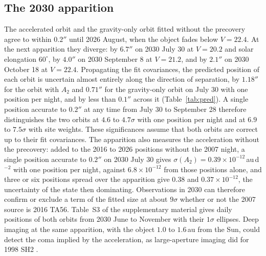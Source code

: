 \documentclass[3p,11pt]{elsarticle}
\begin{document}
\subsection{The 2030 apparition}

The accelerated orbit and the gravity-only orbit fitted without the precovery agree to
within $0.2''$ until 2026 August, when the object fades below $V=22.4$. At the next
apparition they diverge: by $6.7''$ on 2030 July 30 at $V=20.2$ and solar elongation
$60^\circ$, by $4.0''$ on 2030 September 8 at $V=21.2$, and by $2.1''$ on 2030 October 18
at $V=22.4$. Propagating the fit covariances, the predicted position of each orbit is
uncertain almost entirely along the direction of separation, by $1.18''$ for the orbit
with $A_2$ and $0.71''$ for the gravity-only orbit on July 30 with one position per night,
and by less than $0.1''$ across it (Table~\ref{tab:pred}). A single position accurate to
$0.2''$ at any time from July 30 to September 28 therefore distinguishes the two orbits at
$4.6$ to $4.7\sigma$ with one position per night and at $6.9$ to $7.5\sigma$ with site
weights. These significances assume that both orbits are correct up to their fit
covariances. The apparition also measures the acceleration without the precovery: added to
the 2016 to 2026 positions without the 2007 night, a single position accurate to $0.2''$
on 2030 July 30 gives $\sigma(A_2)=0.39\times10^{-12}$\,au\,d$^{-2}$ with one position per
night, against $6.8\times10^{-12}$ from those positions alone, and three or six positions
spread over the apparition give $0.38$ and $0.37\times10^{-12}$, the uncertainty of the
state then dominating. Observations in 2030 can therefore confirm or exclude a term of the
fitted size at about $9\sigma$ whether or not the 2007 source is 2016 TA56. Table~S3 of the
supplementary material gives daily positions of both orbits from 2030 June to November
with their $1\sigma$ ellipses. Deep imaging at the same apparition, with the object $1.0$
to $1.6$\,au from the Sun, could detect the coma implied by the acceleration, as
large-aperture imaging did for 1998 SH2 \citep{Farnocchia2026}.
\end{document}
